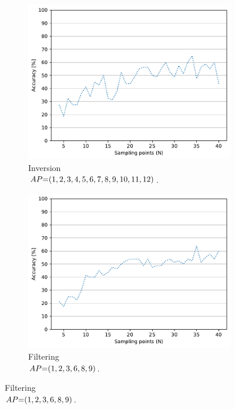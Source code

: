 \begin{figure}[!t]
    \begin{subfigure}{.49\textwidth}
        \centering
        \includegraphics[width=.99\linewidth]{Figures/RadarExperiments/Datasets/SensorsComparison/Walabot/samples-inversion.pdf}
        \vspace{-18pt}
        \captionsetup{width=.99\linewidth}
        \caption{Inversion \\ $\splitatcommas{AP{=}(1,2,3,4,5,6,7,8,9,10,11,12)}$.}
        \label{fig:radar-experiments:sensors:walabot-samples:inversion}
    \end{subfigure}
    \begin{subfigure}{.49\textwidth}
        \centering
        \includegraphics[width=.99\linewidth]{Figures/RadarExperiments/Datasets/SensorsComparison/Walabot/samples-filtering.pdf}
        \vspace{-18pt}
        \captionsetup{width=.99\linewidth}
        \caption{Filtering \\ $\splitatcommas{AP{=}(1,2,3,6,8,9)}$.}
        \label{fig:radar-experiments:sensors:walabot-samples:filtering}
    \end{subfigure}
    

\end{figure}
